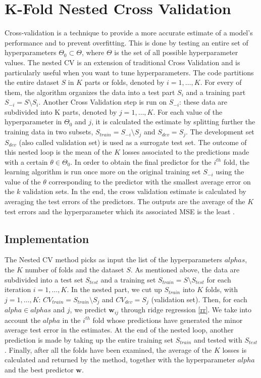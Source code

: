 \documentclass{article}
\begin{document}
\section{K-Fold Nested Cross Validation}
\label{sec:kfold}
Cross-validation is a technique to provide a more accurate estimate of a model's performance and to prevent overfitting. This is done by testing an entire set of hyperparameters $\Theta_0 \subset \Theta$, where $\Theta$ is the set of all possible hyperparameter values. The nested CV is an extension of traditional Cross Validation and is particularly useful when you want to tune hyperparameters.
The code partitions the entire dataset $S$ in $K$ parts or folds, denoted by $i = 1,\dots,K$. For every of them, the algorithm organizes the data into a test part $S_i$ and a training part $S_{-i} = S \setminus S_{i}$. Another Cross Validation step is run on $S_{-i}$: these data are subdivided into K parts, denoted by $j = 1,\dots,K$. For each value of the hyperparameter in $\Theta_0$ and $j$, it is calculated the estimate by splitting further the training data in two subsets, $S_{train} = S_{-i} \setminus S_{j}$ and $S_{dev} = S_{j}$. The development set $S_{dev}$ (also called validation set) is used as a surrogate test set. The outcome of this nested loop is the mean of the $K$ losses associated to the predictions made with a certain $\theta \in \Theta_0$. In order to obtain the final predictor for the $i^{th}$ fold, the learning algorithm is run once more on the original training set $S_{-i}$ using the value of the $\theta$ corresponding to the predictor with the smallest average error on the $k$ validation sets. In the end, the cross validation estimate is calculated by averaging the test errors of the predictors. The outputs are the average of the $K$ test errors and the hyperparameter which its associated MSE is the least \cite{profcv}. \newline

\subsection{Implementation}
The Nested CV method picks as input the list of the hyperparameters $alphas$, the $K$ number of folds and the dataset $S$. As mentioned above, the data are subdivided into a test set $S_{test}$ and a training set $S_{train} = S \setminus S_{test}$ for each iteration $i = 1, \dots, K$. In the nested part, we cut up $S_{train}$ into $K$ folds, with $j = 1, \dots, K$: $CV_{train} = S_{train} \setminus S_j$ and $CV_{dev} = S_j$ (validation set). Then, for each $alpha \in alphas$ and $j$, we predict $\boldsymbol{w}_{ij}$ through ridge regression \eqref{rr}. We take into account the $alpha$ in the $i^{th}$ fold whose predictions have generated the minor average test error in the estimates. At the end of the nested loop, another prediction is made by taking up the entire training set $S_{train}$ and tested with $S_{test}$.
Finally, after all the folds have been examined, the average of the $K$ losses is calculated and returned by the method, together with the hyperparameter $alpha$ and the best predictor $\boldsymbol{w}$. 
\end{document}
